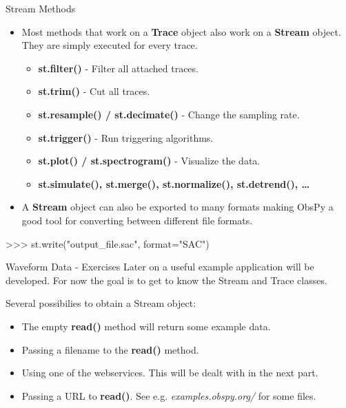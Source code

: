 \begin{frame}{Stream Methods}

 \begin{itemize}
     \item Most methods that work on a \textbf{Trace} object also work on a \textbf{Stream} object. They are simply executed for every trace.
         \begin{itemize}
             \item \textbf{st.filter()} - Filter all attached traces.
             \item \textbf{st.trim()} - Cut all traces.
             \item \textbf{st.resample() / st.decimate()} - Change the sampling rate.
             \item \textbf{st.trigger()} - Run triggering algorithms.
             \item \textbf{st.plot() / st.spectrogram()} - Visualize the data.
             \item \textbf{st.simulate(), st.merge(), st.normalize(), st.detrend(), \dots}
         \end{itemize}
     \item A \textbf{Stream} object can also be exported to many formats making ObsPy a good tool for converting between different file formats.

\end{itemize}
\begin{myColorBox}{0.95}{}
\begin{python}
>>> st.write("output_file.sac", format="SAC")
\end{python}
\end{myColorBox}

\end{frame}

\begin{frame}{Waveform Data - Exercises}
    Later on a useful example application will be developed. For now the goal is to get to know the Stream and Trace classes.

    \vspace{2ex}

    Several possibilies to obtain a Stream object:
    \begin{itemize}
        \item The empty \textbf{read()} method will return some example data.
        \item Passing a filename to the \textbf{read()} method.
        \item Using one of the webservices. This will be dealt with in the next part.
        \item Passing a URL to \textbf{read()}. See e.g. \textit{examples.obspy.org/} for some files.
    \end{itemize}

    \vspace{2ex}

\end{frame}

